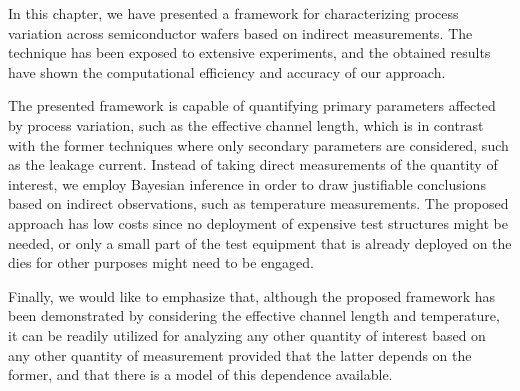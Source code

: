 In this chapter, we have presented a framework for characterizing process
variation across semiconductor wafers based on indirect measurements. The
technique has been exposed to extensive experiments, and the obtained results
have shown the computational efficiency and accuracy of our approach.

The presented framework is capable of quantifying primary parameters affected by
process variation, such as the effective channel length, which is in contrast
with the former techniques where only secondary parameters are considered, such
as the leakage current. Instead of taking direct measurements of the quantity of
interest, we employ Bayesian inference in order to draw justifiable conclusions
based on indirect observations, such as temperature measurements. The proposed
approach has low costs since no deployment of expensive test structures might be
needed, or only a small part of the test equipment that is already deployed on
the dies for other purposes might need to be engaged.

Finally, we would like to emphasize that, although the proposed framework has
been demonstrated by considering the effective channel length and temperature,
it can be readily utilized for analyzing any other quantity of interest based on
any other quantity of measurement provided that the latter depends on the
former, and that there is a model of this dependence available.
